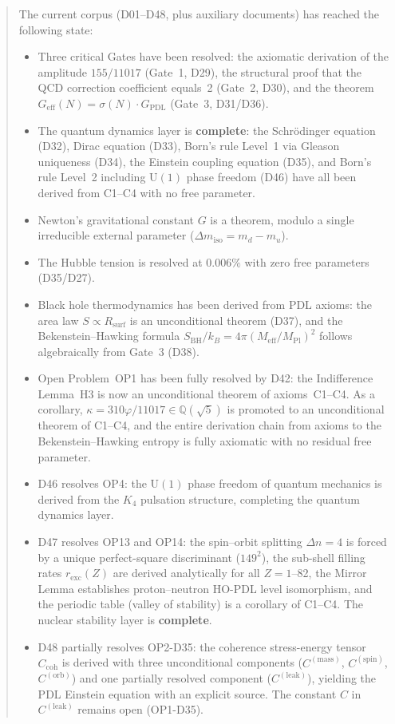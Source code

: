 \documentclass[11pt,a4paper]{article}
\theoremstyle{plain}
\theoremstyle{definition}
\theoremstyle{remark}
\newcommand{\Kfour}{K_4}
\newcommand{\Geff}{G_{\mathrm{eff}}}
\newcommand{\GPDL}{G_{\mathrm{PDL}}}
\newcommand{\Rsurf}{R_{\mathrm{surf}}}
\newcommand{\sigmaN}{\sigma(N)}
\newcommand{\SBH}{S_{\mathrm{BH}}}
\newcommand{\Meff}{M_{\mathrm{eff}}}
\newcommand{\MPl}{M_{\mathrm{Pl}}}
\newcommand{\Ccoh}{C_{\mathrm{coh}}}
\begin{document}
\begin{abstract}
The current corpus (D01--D48, plus auxiliary documents) has reached the following state:
\begin{itemize}
\item Three critical Gates have been resolved: the axiomatic derivation of the amplitude $155/11017$ (Gate~1, D29), the structural proof that the QCD correction coefficient equals~2 (Gate~2, D30), and the theorem $\Geff(N)=\sigmaN\cdot\GPDL$ (Gate~3, D31/D36).
\item The quantum dynamics layer is \textbf{complete}: the Schr\"odinger equation (D32), Dirac equation (D33), Born's rule Level~1 via Gleason uniqueness (D34), the Einstein coupling equation (D35), and Born's rule Level~2 including $\mathrm{U}(1)$ phase freedom (D46) have all been derived from C1--C4 with no free parameter.
\item Newton's gravitational constant $G$ is a theorem, modulo a single irreducible external parameter ($\Delta m_{\mathrm{iso}} = m_d - m_u$).
\item The Hubble tension is resolved at $0.006\%$ with zero free parameters (D35/D27).
\item Black hole thermodynamics has been derived from PDL axioms: the area law $S \propto \Rsurf$ is an unconditional theorem (D37), and the Bekenstein--Hawking formula $\SBH/k_B = 4\pi(\Meff/\MPl)^2$ follows algebraically from Gate~3 (D38).
\item Open Problem~OP1 has been fully resolved by D42: the Indifference Lemma~H3 is now an unconditional theorem of axioms~C1--C4. As a corollary, $\kappa = 310\varphi/11017 \in \mathbb{Q}(\sqrt{5})$ is promoted to an unconditional theorem of C1--C4, and the entire derivation chain from axioms to the Bekenstein--Hawking entropy is fully axiomatic with no residual free parameter.
\item D46 resolves OP4: the $\mathrm{U}(1)$ phase freedom of quantum mechanics is derived from the $\Kfour$ pulsation structure, completing the quantum dynamics layer.
\item D47 resolves OP13 and OP14: the spin--orbit splitting $\Delta n = 4$ is forced by a unique perfect-square discriminant ($149^2$), the sub-shell filling rates $r_{\mathrm{exc}}(Z)$ are derived analytically for all $Z = 1$--82, the Mirror Lemma establishes proton--neutron HO-PDL level isomorphism, and the periodic table (valley of stability) is a corollary of C1--C4. The nuclear stability layer is \textbf{complete}.
\item D48 partially resolves OP2-D35: the coherence stress-energy tensor $\Ccoh$ is derived with three unconditional components ($C^{(\mathrm{mass})}$, $C^{(\mathrm{spin})}$, $C^{(\mathrm{orb})}$) and one partially resolved component ($C^{(\mathrm{leak})}$), yielding the PDL Einstein equation with an explicit source. The constant $C$ in $C^{(\mathrm{leak})}$ remains open (OP1-D35).

\end{itemize}
\end{abstract}
\end{document}
